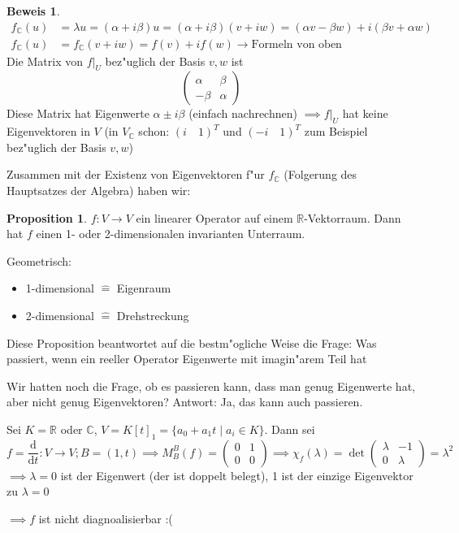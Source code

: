 \documentclass[oneside,fontsize=11pt,paper=a4,BCOR=0mm,DIV=12,automark,headsepline]{scrbook}
\newcommand{\gq}[1]{\glqq{}#1\grqq{}} %
\theoremstyle{remark}
\theoremstyle{definition}
\newtheorem*{proposition}{Proposition}
\theoremstyle{definition}
\newtheorem*{prof}{Beweis}
\theoremstyle{remark}
\begin{document}
\begin{prof}
  \begin{align*}
    f_{\mathbb{C}}(u) &= \lambda u = (\alpha + i \beta) u = (\alpha + i\beta)(v + iw) = (\alpha v - \beta w) + i(\beta v + \alpha w)\\
    f_{\mathbb{C}}(u) &= f_{\mathbb{C}}(v+iw) = f(v) + if(w) \rightarrow \text{Formeln von oben}
  \end{align*}
  Die Matrix von \(f|_U\) bez"uglich der Basis \(v, w\) ist
  \[
    \begin{pmatrix}
      \alpha & \beta \\
      -\beta & \alpha
    \end{pmatrix}
  \]
  Diese Matrix hat Eigenwerte \(\alpha \pm i\beta\) (einfach nachrechnen) \(\implies f|_U\) hat keine Eigenvektoren in \(V\) (in \(V_{\mathbb{C}}\) schon: \((i\quad 1)^T\) und \((-i\quad 1)^T\) zum Beispiel bez"uglich der Basis \(v, w\))
\end{prof}

Zusammen mit der Existenz von Eigenvektoren f"ur $f_{\mathbb{C}}$ (Folgerung des Hauptsatzes der Algebra) haben wir:

\begin{proposition}
  \(f: V\to V\) ein linearer Operator auf einem $\mathbb{R}$-Vektorraum. Dann hat $f$ einen 1-
  oder 2-dimensionalen invarianten Unterraum.
\end{proposition}

\begin{relation}
  Geometrisch:
  \begin{itemize}
  \item 1-dimensional \(\hat{=}\) Eigenraum
  \item 2-dimensional \(\hat{=}\) Drehstreckung
  \end{itemize}
\end{relation}

Diese Proposition beantwortet auf die bestm"ogliche Weise die Frage: \gq{Was
  passiert, wenn ein reeller Operator Eigenwerte mit imagin"arem Teil hat}

\begin{exa}
  Wir hatten noch die Frage, ob es passieren kann, dass man \gq{genug} Eigenwerte hat, aber nicht genug Eigenvektoren? Antwort: Ja, das kann auch passieren.

  Sei \(K = \mathbb{R}\) oder \(\mathbb{C}\), \(V = K[t]_1 = \{a_0 + a_1 t\mid a_i\in K\}\). Dann sei
  \[f = \frac{\text{d}}{\text{d}t}: V\to V; B = (1, t) \implies M^B_B(f) =
    \begin{pmatrix}
      0 & 1 \\
      0 & 0
    \end{pmatrix}
    \implies \chi_f(\lambda) = \det
    \begin{pmatrix}
      \lambda & -1 \\
      0 & \lambda
    \end{pmatrix} = \lambda^2
  \] \(\implies \lambda = 0\) ist der Eigenwert (der ist doppelt belegt), 1 ist der einzige Eigenvektor zu \(\lambda = 0\)

  \(\implies f\) ist nicht diagnoalisierbar :(
\end{exa}
\end{document}

